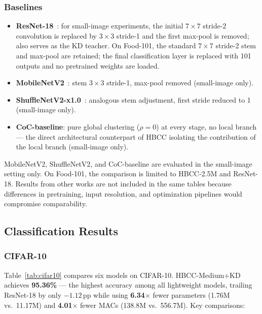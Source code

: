\documentclass[conference]{IEEEtran}
\begin{document}
\subsubsection{Baselines}

\begin{itemize}
  \item \textbf{ResNet-18}~\cite{He2016ResNet}: for small-image
        experiments, the initial $7\!\times\!7$ stride-2 convolution
        is replaced by $3\!\times\!3$ stride-1 and the first
        max-pool is removed; also serves as the KD teacher. On
        Food-101, the standard $7\!\times\!7$ stride-2 stem and
        max-pool are retained; the final classification layer is
        replaced with 101 outputs and no pretrained weights are
        loaded.
  \item \textbf{MobileNetV2}~\cite{Sandler2018MobileNetV2}: stem
        $3\!\times\!3$ stride-1, max-pool removed (small-image only).
  \item \textbf{ShuffleNetV2-x1.0}~\cite{Ma2018ShuffleNetV2}:
        analogous stem adjustment, first stride reduced to 1
        (small-image only).
  \item \textbf{CoC-baseline}: pure global clustering ($\rho{=}0$)
        at every stage, no local branch --- the direct architectural
        counterpart of HBCC isolating the contribution of the local
        branch (small-image only).
\end{itemize}

MobileNetV2, ShuffleNetV2, and CoC-baseline are evaluated in the
small-image setting only. On Food-101, the comparison is limited to
HBCC-2.5M and ResNet-18. Results from other works are not included
in the same tables because differences in pretraining, input
resolution, and optimization pipelines would compromise comparability.

\subsection{Classification Results}

\subsubsection{CIFAR-10}

Table~\ref{tab:cifar10} compares six models on CIFAR-10.
HBCC-Medium+KD achieves \textbf{95.36\%} --- the highest accuracy
among all lightweight models, trailing ResNet-18 by only $-1.12$\,pp
while using \textbf{6.34$\times$} fewer parameters (1.76M vs.\ 11.17M)
and \textbf{4.01$\times$} fewer MACs (138.8M vs.\ 556.7M).
Key comparisons:
\end{document}
